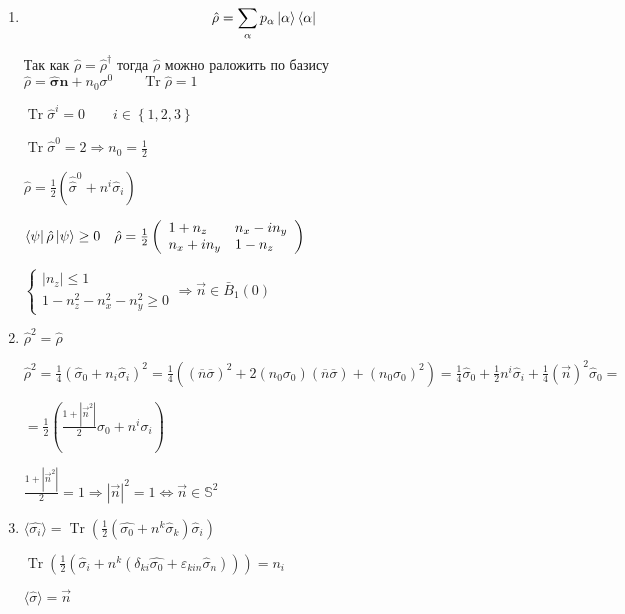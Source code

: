 \begin{solution}
	\begin{enumerate}
		\item
		$$
		\hat{\rho}=\sum_{\alpha} p_{\alpha}\ket{\alpha}\bra{\alpha}
		$$
		
		Так как $ \hat{\rho} = \hat{\rho}^\dagger $  тогда $ \hat{\rho} $ можно раложить по базису 
		$
		\hat{\rho} = \hat{\boldsymbol{\sigma}}\boldsymbol{n} + n_0 \sigma^0
		\qquad
		\operatorname{Tr} \hat{\rho}=1
		$
		
		$
		\operatorname{Tr} \hat{\sigma}^{i}=0 \qquad i \in \left\lbrace 1,2,3\right\rbrace
		$
		
		$
		\operatorname{Tr} \hat{\sigma}^{0}=2 \Longrightarrow n_{0}=\frac{1}{2}
		$
		
		$
		\hat{\rho}=\frac{1}{2}\left(\hat{\hat{\sigma}}^{0}+n^{i} \hat{\sigma}_{i}\right)
		$
		
		$
		\bra{\psi}\hat{\rho}\ket{\psi}\geq 0
		\quad
		\hat{\rho} = 
		\frac{1}{2}\left(\begin{array}{ll}{1+n_{z}} & {n_{x} -i n_{y}} \\ n_{x}+{i n_{y}} & {1-n_{z}}\end{array}\right)
		$
		
		
		$
		\left\lbrace\begin{array}{l}{\left|n_{z}\right| \leq 1} \\ {1-n_{z}^{2}-n_{x}^{2}-n_y^{2} \geq 0}\end{array}\right.
		\Longrightarrow
		\vec{n} \in \bar{B}_{1}(0)
		$
		
		\item 
		
		$
		\hat{\rho}^{2}=\hat{\rho}
		$
		
		$
		\hat{\rho}^{2}=\frac{1}{4}\left(\hat{\sigma}_{0}+n_i \hat{\sigma}_{i}\right)^{2} =\frac{1}{4} \left(
		\left(\overline{n} \overline{\sigma}\right)^{2}+2\left(n_{0} \sigma_0\right)(\overline{n} \overline{\sigma})+\left(n_{0} \sigma_0 \right)^{2}
		\right) = 
		\frac{1}{4} \hat{\sigma}_{0}+\frac{1}{2} n^{i} \hat{\sigma}_{i}+\frac{1}{4}(\vec{n})^{2} \hat{\sigma}_{0} =
		$
		
		$
		=\frac{1}{2}\left(\frac{1+|\vec{n}^2|}{2}\sigma_{0} +n^i \sigma_{i}\right)
		$
		
		$	
		\frac{1+|\vec{n}^2|}{2}=1 \Longrightarrow 	|\vec{n}|^{2}=1 \Longleftrightarrow 
		\vec{n} \in \mathbb{S}^{2}
		$
		
		\item 
		$
		\langle \hat{\sigma_{i}}\rangle = \operatorname{Tr}\left( \frac{1}{2}\left( \hat{\sigma_{0}}+ n^k \hat{\sigma}_k\right) \hat{\sigma}_{i} \right)
		$
		
		
		$
		\operatorname{Tr}\left(\frac{1}{2}\left(\hat{\sigma}_{i}+n^{k}\left(\delta_{ki} \hat{\sigma_{0}}+\varepsilon_{kin} \hat{\sigma}_{n}\right)\right)\right) = 
		n_{i}
		$
		
		$
		\langle\hat{\sigma}\rangle=\vec{n}
		$
		
	\end{enumerate}
\end{solution}	


